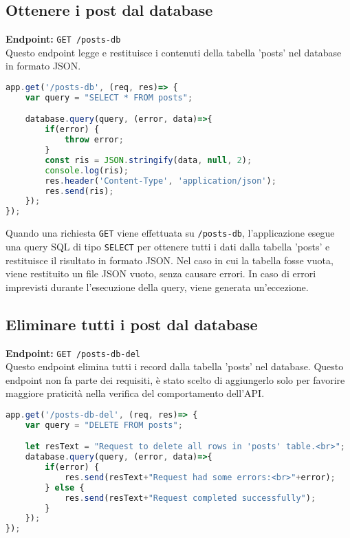 \documentclass{article}
\begin{document}
\subsection{Ottenere i post dal database}
\textbf{Endpoint:} \texttt{GET /posts-db}\\
Questo endpoint legge e restituisce i contenuti della tabella 'posts' nel database in formato JSON.

\begin{lstlisting}[language=JavaScript, caption={Implementazione dell'endpoint per ottenere i contenuti della tabella 'posts' dal database}, label={lst:getPostsDbEndpoint}]
app.get('/posts-db', (req, res)=> {
    var query = "SELECT * FROM posts";

    database.query(query, (error, data)=>{
        if(error) {
            throw error;
        }
        const ris = JSON.stringify(data, null, 2);
        console.log(ris);
        res.header('Content-Type', 'application/json');
        res.send(ris);
    });
});
\end{lstlisting}

Quando una richiesta \texttt{GET} viene effettuata su \texttt{/posts-db}, l'applicazione esegue una query SQL di tipo \texttt{SELECT} per ottenere tutti i dati dalla tabella 'posts' e restituisce il risultato in formato JSON.
Nel caso in cui la tabella fosse vuota, viene restituito un file JSON vuoto, senza causare errori.
In caso di errori imprevisti durante l'esecuzione della query, viene generata un'eccezione.

\subsection{Eliminare tutti i post dal database}
\textbf{Endpoint:} \texttt{GET /posts-db-del}\\
Questo endpoint elimina tutti i record dalla tabella 'posts' nel database.
\linebreak
Questo endpoint non fa parte dei requisiti, è stato scelto di aggiungerlo solo per favorire maggiore praticità nella verifica del comportamento dell'API. 

\begin{lstlisting}[language=JavaScript, caption={Implementazione dell'endpoint per eliminare tutte le righe dalla tabella 'posts' del database}, label={lst:deletePostsDbEndpoint}]
app.get('/posts-db-del', (req, res)=> {
    var query = "DELETE FROM posts";

    let resText = "Request to delete all rows in 'posts' table.<br>";
    database.query(query, (error, data)=>{
        if(error) {
            res.send(resText+"Request had some errors:<br>"+error);
        } else {
            res.send(resText+"Request completed successfully");
        }
    });
});
\end{lstlisting}
\end{document}
